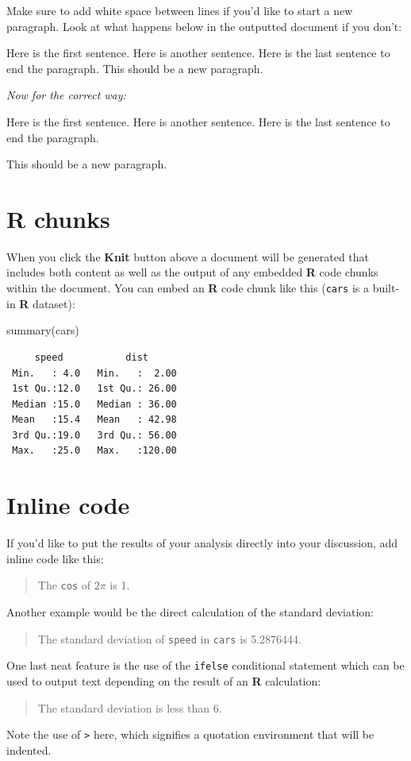 \documentclass[12pt,twoside]{reedthesis}
\newenvironment{Shaded}{\begin{snugshade}}{\end{snugshade}}
\newcommand{\FunctionTok}[1]{\textcolor[rgb]{0.00,0.00,0.00}{#1}}
\newcommand{\NormalTok}[1]{#1}
\begin{document}
Make sure to add white space between lines if you'd like to start a new paragraph. Look at what happens below in the outputted document if you don't:

Here is the first sentence. Here is another sentence. Here is the last sentence to end the paragraph.
This should be a new paragraph.

\emph{Now for the correct way:}

Here is the first sentence. Here is another sentence. Here is the last sentence to end the paragraph.

This should be a new paragraph.

\hypertarget{r-chunks}{%
\section{R chunks}\label{r-chunks}}

When you click the \textbf{Knit} button above a document will be generated that includes both content as well as the output of any embedded \textbf{R} code chunks within the document. You can embed an \textbf{R} code chunk like this (\texttt{cars} is a built-in \textbf{R} dataset):
\begin{Shaded}
\begin{Highlighting}[]
\FunctionTok{summary}\NormalTok{(cars)}
\end{Highlighting}
\end{Shaded}
\begin{verbatim}
     speed           dist       
 Min.   : 4.0   Min.   :  2.00  
 1st Qu.:12.0   1st Qu.: 26.00  
 Median :15.0   Median : 36.00  
 Mean   :15.4   Mean   : 42.98  
 3rd Qu.:19.0   3rd Qu.: 56.00  
 Max.   :25.0   Max.   :120.00  
\end{verbatim}
\hypertarget{inline-code}{%
\section{Inline code}\label{inline-code}}

If you'd like to put the results of your analysis directly into your discussion, add inline code like this:
\begin{quote}
The \texttt{cos} of \(2 \pi\) is 1.
\end{quote}
Another example would be the direct calculation of the standard deviation:
\begin{quote}
The standard deviation of \texttt{speed} in \texttt{cars} is 5.2876444.
\end{quote}
One last neat feature is the use of the \texttt{ifelse} conditional statement which can be used to output text depending on the result of an \textbf{R} calculation:
\begin{quote}
The standard deviation is less than 6.
\end{quote}
Note the use of \texttt{\textgreater{}} here, which signifies a quotation environment that will be indented.
\end{document}
